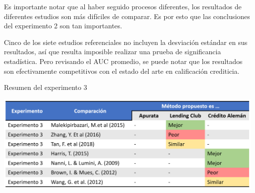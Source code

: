 Es importante notar que al haber seguido procesos diferentes, los resultados de diferentes estudios son más difíciles de comparar. Es por esto que las conclusiones del experimento 2 son tan importantes.

Cinco de los siete estudios referenciales no incluyen la desviación estándar en sus resultados, así que resulta imposible realizar una prueba de significancia estadística. Pero revisando el \ac{AUC} promedio, se puede notar que los resultados son efectivamente competitivos con el estado del arte en calificación crediticia.

\begin{table}[htbp]
    \centering
    \caption{Resumen del experimento 3}
    \includegraphics[width=\linewidth]{graficos/propios/resumen_experimento3.PNG}
    \label{tab:summary3}
\end{table}
